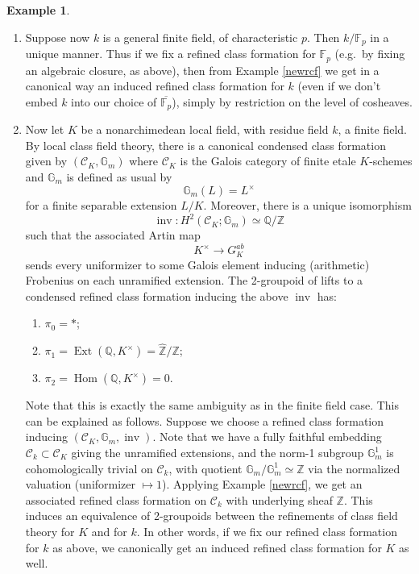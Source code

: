 \documentclass[12pt]{article}
\theoremstyle{definition}
\newtheorem{example}[theorem]{Example}
\newcommand{\on}{\operatorname}
\newcommand{\mc}{\mathcal}
\newcommand{\mbb}{\mathbb}
\newcommand{\wh}{\widehat}
\begin{document}
\begin{example}
\begin{enumerate}
It is unclear to the author whether one can expect a canonical choice of refined class formation in this setting, or equivalently, if one can expect a canonical choice of algebraic closure of $\mbb{F}_p$ ``up to powers of Frobenius".  (It is also unclear to the author how to make the word ``canonical" precise, so as to turn this into a well-defined mathematical question.)
\item Suppose now $k$ is a general finite field, of characteristic $p$.  Then $k/\mbb{F}_p$ in a unique manner.  Thus if we fix a refined class formation for $\mbb{F}_p$ (e.g.\ by fixing an algebraic closure, as above), then from Example \ref{newrcf} we get in a canonical way an induced refined class formation for $k$ (even if we don't embed $k$ into our choice of $\overline{\mbb{F}_p}$), simply by restriction on the level of cosheaves.
\item Now let $K$ be a nonarchimedean local field, with residue field $k$, a finite field.  By local class field theory, there is a canonical condensed class formation given by $(\mc{C}_K,\mbb{G}_m)$ where $\mc{C}_K$ is the Galois category of finite etale $K$-schemes and $\mbb{G}_m$ is defined as usual by
$$\mbb{G}_m(L) = L^\times$$
for a finite separable extension $L/K$.  Moreover, there is a unique isomorphism
$$\on{inv}:H^2(\mc{C}_K;\mbb{G}_m)\simeq\mbb{Q}/\mbb{Z}$$
such that the associated Artin map
$$K^\times \to G_K^{ab}$$
sends every uniformizer to some Galois element inducing (arithmetic) Frobenius on each unramified extension.  The 2-groupoid of lifts to a condensed refined class formation inducing the above $\on{inv}$ has:
\begin{enumerate}
\item $\pi_0=\ast$;
\item $\pi_1=\on{Ext}(\mbb{Q},K^\times)=\wh{\mbb{Z}}/\mbb{Z}$;
\item $\pi_2=\on{Hom}(\mbb{Q},K^\times)=0$.
\end{enumerate}
 Note that this is exactly the same ambiguity as in the finite field case.  This can be explained as follows.  Suppose we choose a refined class formation inducing $(\mc{C}_K,\mbb{G}_m,\on{inv})$.  Note that we have a fully faithful embedding $\mc{C}_k\subset \mc{C}_K$ giving the unramified extensions, and the norm-1 subgroup $\mbb{G}_m^1$ is cohomologically trivial on $\mc{C}_k$, with quotient $\mbb{G}_m/\mbb{G}_m^1\simeq\mbb{Z}$ via the normalized valuation (uniformizer $\mapsto 1$).  Applying Example \ref{newrcf}, we get an associated refined class formation on $\mc{C}_k$ with underlying sheaf $\mbb{Z}$.  This induces an equivalence of 2-groupoids between the refinements of class field theory for $K$ and for $k$.  In other words, if we fix our refined class formation for $k$ as above, we canonically get an induced refined class formation for $K$ as well.
 

\end{enumerate}
\end{example}
\end{document}
